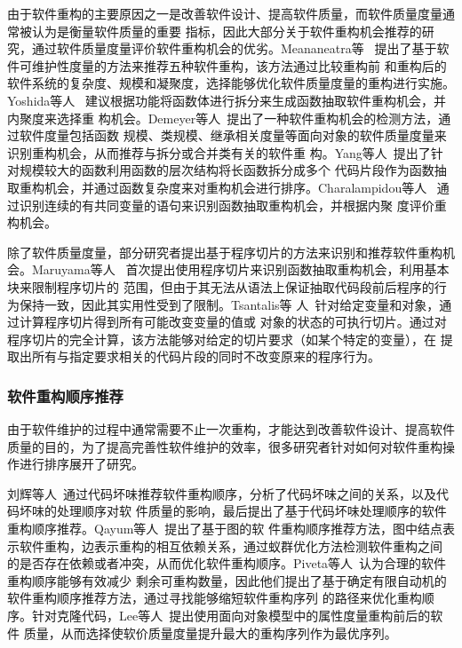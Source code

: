 由于软件重构的主要原因之一是改善软件设计、提高软件质量，而软件质量度量通常被认为是衡量软件质量的重要
指标，因此大部分关于软件重构机会推荐的研究，通过软件质量度量评价软件重构机会的优劣。Meananeatra等
~\cite{meananeatra2011using}提出了基于软件可维护性度量的方法来推荐五种软件重构，该方法通过比较重构前
和重构后的软件系统的复杂度、规模和凝聚度，选择能够优化软件质量度量的重构进行实施。Yoshida等人
~\cite{yoshida2012cohesion}建议根据功能将函数体进行拆分来生成函数抽取软件重构机会，并内聚度来选择重
构机会。Demeyer等人~\cite{demeyer2000finding}提出了一种软件重构机会的检测方法，通过软件度量包括函数
规模、类规模、继承相关度量等面向对象的软件质量度量来识别重构机会，从而推荐与拆分或合并类有关的软件重
构。Yang等人~\cite{yang2009identifying}提出了针对规模较大的函数利用函数的层次结构将长函数拆分成多个
代码片段作为函数抽取重构机会，并通过函数复杂度来对重构机会进行排序。Charalampidou等人
~\cite{charalampidou2016identifying}通过识别连续的有共同变量的语句来识别函数抽取重构机会，并根据内聚
度评价重构机会。


除了软件质量度量，部分研究者提出基于程序切片的方法来识别和推荐软件重构机会。Maruyama等人
~\cite{maruyama2001automated}首次提出使用程序切片来识别函数抽取重构机会，利用基本块来限制程序切片的
范围，但由于其无法从语法上保证抽取代码段前后程序的行为保持一致，因此其实用性受到了限制。Tsantalis等
人~\cite{tsantalis2011identification}针对给定变量和对象，通过计算程序切片得到所有可能改变变量的值或
对象的状态的可执行切片。通过对程序切片的完全计算，该方法能够对给定的切片要求（如某个特定的变量），在
提取出所有与指定要求相关的代码片段的同时不改变原来的程序行为。

\subsubsection{软件重构顺序推荐}
由于软件维护的过程中通常需要不止一次重构，才能达到改善软件设计、提高软件质量的目的，为了提高完善性软件维护的效率，很多研究者针对如何对软件重构操作进行排序展开了研究。

刘辉等人~\cite{50}通过代码坏味推荐软件重构顺序，分析了代码坏味之间的关系，以及代码坏味的处理顺序对软
件质量的影响，最后提出了基于代码坏味处理顺序的软件重构顺序推荐。Qayum等人~\cite{57}提出了基于图的软
件重构顺序推荐方法，图中结点表示软件重构，边表示重构的相互依赖关系，通过蚁群优化方法检测软件重构之间
的是否存在依赖或者冲突，从而优化软件重构顺序。Piveta等人~\cite{60}认为合理的软件重构顺序能够有效减少
剩余可重构数量，因此他们提出了基于确定有限自动机的软件重构顺序推荐方法，通过寻找能够缩短软件重构序列
的路径来优化重构顺序。针对克隆代码，Lee等人~\cite{63}提出使用面向对象模型中的属性度量重构前后的软件
质量，从而选择使软价质量度量提升最大的重构序列作为最优序列。
